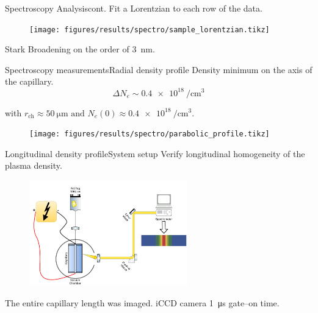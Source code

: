 \documentclass[dvipsnames]{beamer}
\begin{document}
\begin{frame}{Spectroscopy Analysis}{cont.}
Fit a Lorentzian to each row of the data.
\begin{figure}
  \texttt{[image: figures/results/spectro/sample\_lorentzian.tikz]}
\end{figure}
Stark Broadening on the order of \SI{3}{\nm}.
\end{frame}
\begin{frame}{Spectroscopy measurements}{Radial density profile}
 {\small Density minimum on the axis of the capillary.}
 \begin{equation*}
\Delta N_e \sim \SI{0.4e18}{\per \cubic \cm}
 \end{equation*}
\begin{center}
 with $r_\text{ch}\approx \SI{50}{\um} \text{ and } N_e\left(0\right)\approx \SI{0.4e18}{\per\cubic\cm}.$
\end{center}
\begin{figure}
\texttt{[image: figures/results/spectro/parabolic\_profile.tikz]}
\end{figure}
\end{frame}
\begin{frame}{Longitudinal density profile}{System setup}
 {\small Verify longitudinal homogeneity of the plasma density.}
 \begin{figure}
\includegraphics[height=130pt]{figures/results/spectro/longitudinal_system.pdf}
 \end{figure}
 The entire capillary length was imaged.
 iCCD camera \SI{1}{\us} gate--on time.
\end{frame}
\end{document}
